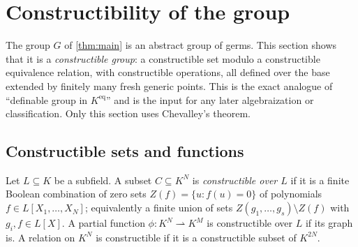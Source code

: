 \section{Constructibility of the group}
\label{sec:constructibility}

The group $G$ of \cref{thm:main} is an abstract group of germs.  This section shows
that it is a \emph{constructible group}: a constructible set modulo a constructible
equivalence relation, with constructible operations, all defined over the base
extended by finitely many fresh generic points.  This is the exact analogue of
``definable group in $K^{\mathrm{eq}}$'' and is the input for any later
algebraization or classification.  Only this section uses Chevalley's theorem.

\subsection{Constructible sets and functions}

\begin{definition}\label{def:constructible}
Let $L\subseteq K$ be a subfield.  A subset $C\subseteq K^N$ is \emph{constructible
over $L$} if it is a finite Boolean combination of zero sets
$Z(f)=\{u: f(u)=0\}$ of polynomials $f\in L[X_1,\dots,X_N]$; equivalently a finite
union of sets $Z(g_1,\dots,g_s)\setminus Z(f)$ with $g_i,f\in L[X]$.  A partial
function $\phi:K^N\rightharpoonup K^M$ is constructible over $L$ if its graph is.
A relation on $K^N$ is constructible if it is a constructible subset of $K^{2N}$.
\end{definition}

